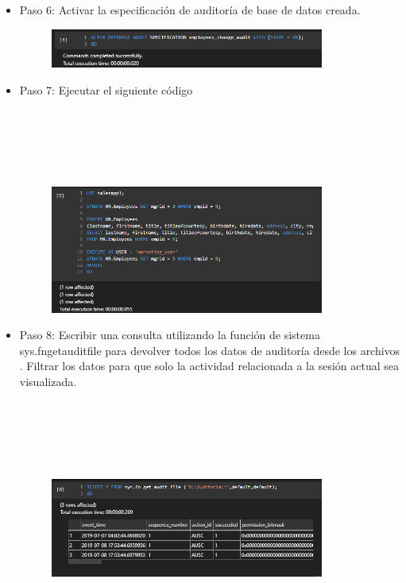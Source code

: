 \begin{itemize}
	\item Paso 6: Activar la especificación de auditoría de base de datos creada.
	\begin{figure}[htb]
	\begin{center}
	\includegraphics[width=9cm]{./Imagenes/audit7}
	\end{center}
	\end{figure}

	\item Paso 7: Ejecutar el siguiente código \\\\\\\\\\\\
	\begin{figure}[htb]
	\begin{center}
	\includegraphics[width=9cm]{./Imagenes/audit8}
	\end{center}
	\end{figure}

	\item Paso 8: Escribir una consulta utilizando la función de sistema sys.fngetauditfile para devolver todos los datos de auditoría desde los archivos . 			 Filtrar los datos para que solo la actividad relacionada a la sesión actual sea visualizada. \\\\\\\\\\\\
	\begin{figure}[htb]
	\begin{center}
	\includegraphics[width=9cm]{./Imagenes/audit9}
	\end{center}
	\end{figure}


\end{itemize}
